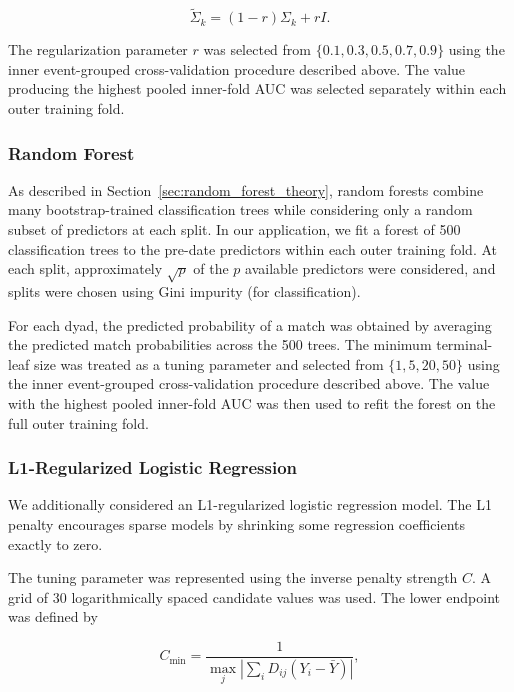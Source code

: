 \documentclass[11pt,letterpaper,reqno]{amsart}
\numberwithin{equation}{subsection}
\theoremstyle{definition}
\numberwithin{thm}{subsection}
\begin{document}
\begin{equation}
\widetilde{\Sigma}_k
=
(1-r)\Sigma_k + rI.
\end{equation}

The regularization parameter $r$ was selected from
$\{0.1, 0.3, 0.5, 0.7, 0.9\}$
using the inner event-grouped cross-validation procedure described above. The value producing the highest pooled inner-fold AUC was selected separately within each outer training fold.

\subsubsection{Random Forest}

As described in Section~\ref{sec:random_forest_theory}, random forests combine many bootstrap-trained classification trees while considering only a random subset of predictors at each split. In our application, we fit a forest of 500 classification trees to the pre-date predictors within each outer training fold. At each split, approximately $\sqrt{p}$ of the $p$ available predictors were considered, and splits were chosen using Gini impurity (for classification).

For each dyad, the predicted probability of a match was obtained by averaging the predicted match probabilities across the 500 trees. The minimum terminal-leaf size was treated as a tuning parameter and selected from $\{1,5,20,50\}$ using the inner event-grouped cross-validation procedure described above. The value with the highest pooled inner-fold AUC was then used to refit the forest on the full outer training fold.

\subsubsection{L1-Regularized Logistic Regression}

We additionally considered an L1-regularized logistic regression model. The L1 penalty encourages sparse models by shrinking some regression coefficients exactly to zero.

The tuning parameter was represented using the inverse penalty strength $C$. A grid of 30 logarithmically spaced candidate values was used. The lower endpoint was defined by

\begin{equation}
C_{\min}
=
\frac{
1
}{
\max_j
\left|
\sum_i
D_{ij}(Y_i-\bar{Y})
\right|
},
\end{equation}
\end{document}
